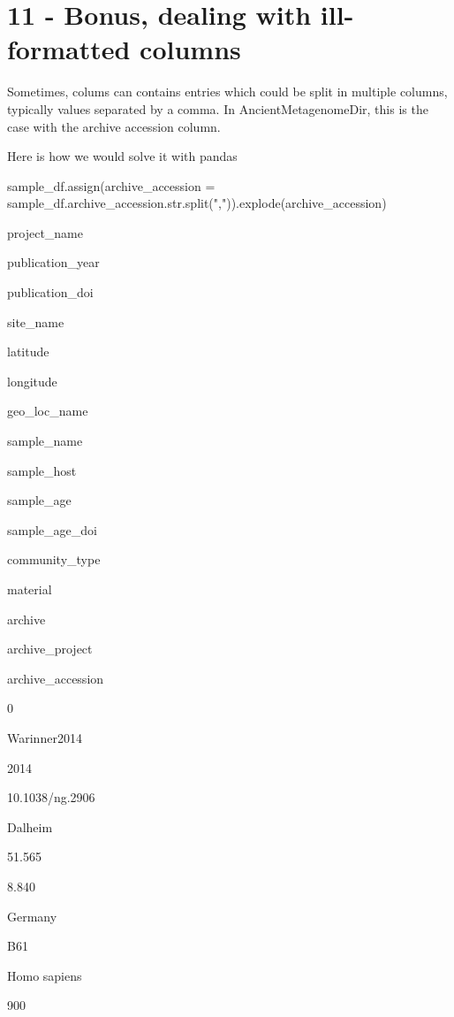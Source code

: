 \documentclass[
  letterpaper,
]{book}
\newenvironment{Shaded}{}{}
\newcommand{\BuiltInTok}[1]{\textcolor[rgb]{0.84,0.23,0.29}{#1}}
\newcommand{\NormalTok}[1]{\textcolor[rgb]{0.14,0.16,0.18}{#1}}
\newcommand{\OperatorTok}[1]{\textcolor[rgb]{0.14,0.16,0.18}{#1}}
\newcommand{\StringTok}[1]{\textcolor[rgb]{0.01,0.18,0.38}{#1}}
\begin{document}
\hypertarget{bonus-dealing-with-ill-formatted-columns}{%
\section{11 - Bonus, dealing with ill-formatted
columns}\label{bonus-dealing-with-ill-formatted-columns}}

Sometimes, colums can contains entries which could be split in multiple
columns, typically values separated by a comma. In AncientMetagenomeDir,
this is the case with the archive accession column.

Here is how we would solve it with pandas

\begin{Shaded}
\begin{Highlighting}[]
\NormalTok{sample\_df.assign(archive\_accession }\OperatorTok{=}\NormalTok{ sample\_df.archive\_accession.}\BuiltInTok{str}\NormalTok{.split(}\StringTok{","}\NormalTok{)).explode(}\StringTok{\textquotesingle{}archive\_accession\textquotesingle{}}\NormalTok{)}
\end{Highlighting}
\end{Shaded}

project\_name

publication\_year

publication\_doi

site\_name

latitude

longitude

geo\_loc\_name

sample\_name

sample\_host

sample\_age

sample\_age\_doi

community\_type

material

archive

archive\_project

archive\_accession

0

Warinner2014

2014

10.1038/ng.2906

Dalheim

51.565

8.840

Germany

B61

Homo sapiens

900
\end{document}
